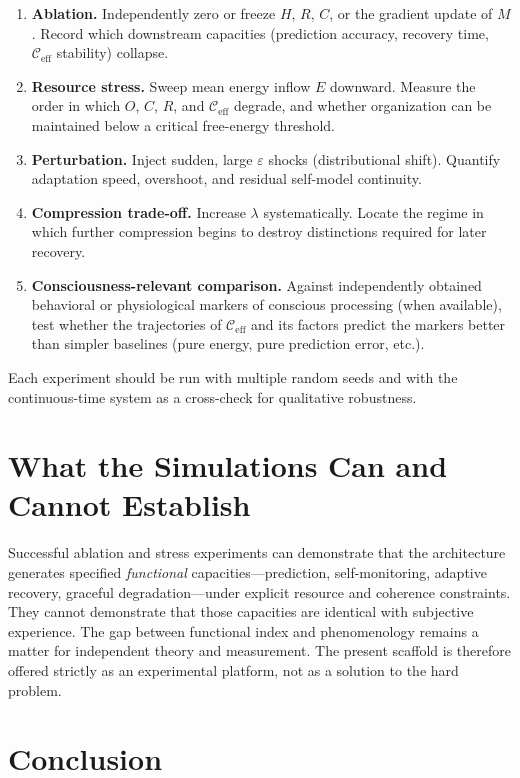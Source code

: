 \documentclass[11pt,a4paper]{article}
\begin{document}
\begin{enumerate}[leftmargin=*]
  \item \textbf{Ablation.} Independently zero or freeze \(H\), \(R\), \(C\), or the gradient update of \(M\). Record which downstream capacities (prediction accuracy, recovery time, \(\mathcal{C}_{\mathrm{eff}}\) stability) collapse.
  \item \textbf{Resource stress.} Sweep mean energy inflow \(E\) downward. Measure the order in which \(O\), \(C\), \(R\), and \(\mathcal{C}_{\mathrm{eff}}\) degrade, and whether organization can be maintained below a critical free-energy threshold.
  \item \textbf{Perturbation.} Inject sudden, large \(\varepsilon\) shocks (distributional shift). Quantify adaptation speed, overshoot, and residual self-model continuity.
  \item \textbf{Compression trade-off.} Increase \(\lambda\) systematically. Locate the regime in which further compression begins to destroy distinctions required for later recovery.
  \item \textbf{Consciousness-relevant comparison.} Against independently obtained behavioral or physiological markers of conscious processing (when available), test whether the trajectories of \(\mathcal{C}_{\mathrm{eff}}\) and its factors predict the markers better than simpler baselines (pure energy, pure prediction error, etc.).
\end{enumerate}

Each experiment should be run with multiple random seeds and with the continuous-time system as a cross-check for qualitative robustness.

\section{What the Simulations Can and Cannot Establish}

Successful ablation and stress experiments can demonstrate that the architecture generates specified \emph{functional} capacities---prediction, self-monitoring, adaptive recovery, graceful degradation---under explicit resource and coherence constraints. They cannot demonstrate that those capacities are identical with subjective experience. The gap between functional index and phenomenology remains a matter for independent theory and measurement. The present scaffold is therefore offered strictly as an experimental platform, not as a solution to the hard problem.

\section{Conclusion}
\end{document}
